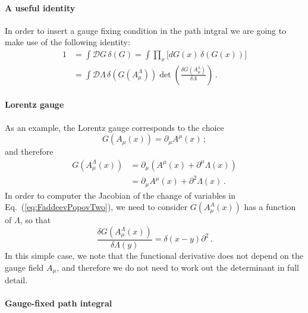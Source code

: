 \documentclass[notes]{subfiles}
\begin{document}
\paragraph{A useful identity}

In order to insert a gauge fixing condition in the path intgral we are
going to make use of the following identity:
\begin{align} 
  \label{eq:FaddeevPopovOne}
  1 &= \int \mathcal{D}G\, \delta(G) = 
      \int \prod_x \Big[ dG(x)\, \delta\left(G(x)\right) \Big]\\
  \label{eq:FaddeevPopovTwo}
    &= \int \mathcal{D}\Lambda\, \delta\left(G\left(
      A^\Lambda_\mu\right)\right)
      \det \left(
      \frac{\delta G\left(A^\lambda_\mu\right)}{\delta \Lambda}
      \right)\, .
\end{align}

\paragraph{Lorentz gauge}

As an example, the Lorentz gauge corresponds to the choice
\begin{equation}
  \label{eq:LorentzGauge}
  G\left(A_\mu(x)\right) = \partial_\mu A^\mu(x)\, ; 
\end{equation}
and therefore
\begin{align}
  G\left(A^\Lambda_\mu(x)\right)
  &= \partial_\mu\left(A^\mu(x) + \partial^\mu\Lambda(x)\right) \\
  &= \partial_\mu A^\mu(x) + \partial^2 \Lambda(x)\, .
\end{align}
In order to computer the Jacobian of the change of variables in
Eq.~(\ref{eq:FaddeevPopovTwo}), we need to consider
$G\left(A^\Lambda_\mu(x)\right)$ has a function of $\Lambda$, so that
\begin{equation}
  \label{eq:GaugeFixDeriv}
  \frac{\delta G\left(A^\Lambda_\mu(x)\right)}{\delta \Lambda(y)} = 
  \delta(x-y) \partial^2\, .
\end{equation}
In this simple case, we note that the functional derivative does not
depend on the gauge field $A_\mu$, and therefore we do not need to
work out the determinant in full detail. 

\paragraph{Gauge-fixed path integral}
\end{document}
